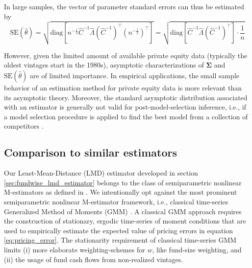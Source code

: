 \documentclass[12pt]{article}
\begin{document}
In large samples, the vector of parameter standard errors can thus be estimated by
\[
\mathrm{SE}(\hat{\theta}) = 
\sqrt{
	\mathrm{diag} \left[
	n^{-\frac{1}{2}}
	\hat{C}^{-1} \hat{\Lambda} (\hat{C}^{-1})^\top
	(n^{-\frac{1}{2}})^\top
	\right] 
}
=
\sqrt{
	\mathrm{diag} \left[
	\hat{C}^{-1} \hat{\Lambda} (\hat{C}^{-1})^\top
	\right] 
	\cdot \frac{1}{n}
}
\]

However, given the limited amount of available private equity data (typically the oldest vintages start in the 1980s), asymptotic characterizations of $\mathbf{\Sigma}$ and $\mathrm{SE}(\hat{\theta})$ are of limited importance. 
In empirical applications, the small sample behavior of an estimation method for private equity data is more relevant than its asymptotic theory.
Moreover, the standard asymptotic distribution associated with an estimator is generally not valid for post-model-selection inference, i.e., if a model selection procedure is applied to find the best model from a collection of competitors \citep{LP05}.


\subsection{Comparison to similar estimators}
\label{sec:comparison_to_similar_estimators}

Our Least-Mean-Distance (LMD) estimator developed in section \ref{sec:fundwise_lmd_estimator} belongs to the class of semiparametric nonlinear M-estimators as defined in \cite{PP97}.
We intentionally opt against the most prominent semiparametric nonlinear M-estimator framework, i.e., classical time-series Generalized Method of Moments (GMM) \citep{H82,H12}.
A classical GMM approach requires the construction of stationary, ergodic time-series of moment conditions that are used to empirically estimate the expected value of pricing errors in equation \ref{eq:pricing_error}.
The stationarity requirement of classical time-series GMM limits (i) more elaborate weighting-schemes for $w$, like fund-size weighting, and (ii) the usage of fund cash flows from non-realized vintages.
\end{document}
